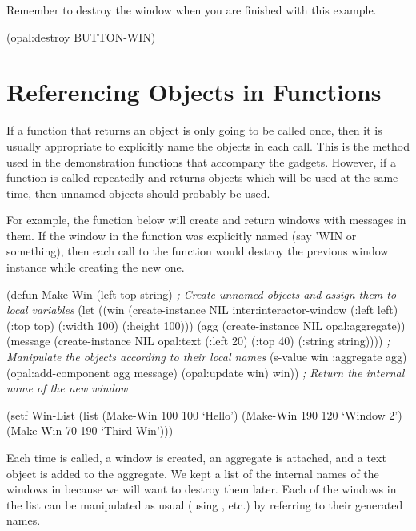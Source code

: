 Remember to destroy the window when you are finished with this example.

\begin{programexample}
(opal:destroy BUTTON-WIN)
\end{programexample}


\section{Referencing Objects in Functions}
\label{function}

If a function that returns an object is only going to be called once,
then it is usually appropriate to explicitly name the objects in each
 call.  This is the method used in the
demonstration functions that accompany the gadgets.  However, if a
function is called repeatedly and returns objects which will be used
at the same time, then unnamed objects should probably be used.

For example, the function below will create and return windows with
messages in them.  If the window in the function was explicitly named
(say 'WIN or something), then each call to the function would destroy
the previous window instance while creating the new one.

\begin{programexample}
(defun Make-Win (left top string)
  {\it ; Create unnamed objects and assign them to local variables}
  (let ((win (create-instance NIL inter:interactor-window
		(:left left) (:top top)
		(:width 100) (:height 100)))
	(agg (create-instance NIL opal:aggregate))
	(message (create-instance NIL opal:text
		    (:left 20) (:top 40)
		    (:string string))))
    {\it ; Manipulate the objects according to their local names}
    (s-value win :aggregate agg)
    (opal:add-component agg message)
    (opal:update win)
    win))  {\it ; Return the internal name of the new window}

(setf Win-List (list (Make-Win 100 100 `Hello')
		     (Make-Win 190 120 `Window 2')
		     (Make-Win 70 190 `Third Win')))
\end{programexample}

Each time  is called, a window is created, an aggregate
is attached, and a text object is added to the aggregate.  We kept a
list of the internal names of the windows in  because we
will want to destroy them later.  Each of the windows in the list can
be manipulated as usual (using , etc.) by referring to
their generated names.

